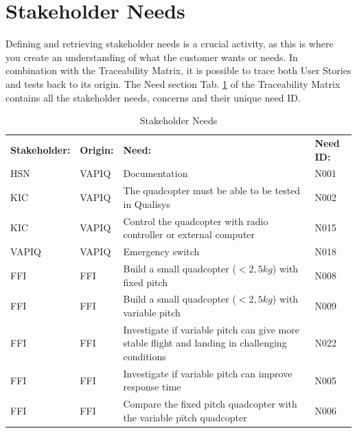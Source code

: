 \clearpage

\section{Stakeholder Needs}
Defining and retrieving stakeholder needs is a crucial activity, as this is where you create an understanding of what the customer wants or needs. In combination with the Traceability Matrix, it is possible to trace both User Stories and tests back to its origin. The Need section Tab. \ref{tab:stakeneeds} of the Traceability Matrix contains all the stakeholder needs, concerns and their unique need ID. 

\begin{table}[h]
    \centering
    \begin{tabular}{|m{2cm} p{1.5cm} p{9cm} p{2cm}|}
    \hline
\rowcolor{cadetgrey}\textbf{Stakeholder: } & \textbf{Origin: } & \textbf{Need: } & \textbf{Need ID: } \\
                        HSN & VAPIQ & Documentation & N001 \\ 
\rowcolor{gainsboro}    KIC & VAPIQ & The quadcopter must be able to be tested in Qualisys & N002\\
                        KIC & VAPIQ & Control the quadcopter with radio controller or external computer & N015  \\ 
\rowcolor{gainsboro}    VAPIQ & VAPIQ & Emergency switch & N018 \\
                        FFI & FFI & Build a small quadcopter ($<2,5 kg$) with fixed pitch & N008 \\ 
\rowcolor{gainsboro}    FFI & FFI & Build a small quadcopter ($<2,5 kg$) with variable pitch & N009\\
                        FFI & FFI & Investigate if variable pitch can give more stable flight and landing in challenging conditions & N022  \\ 
\rowcolor{gainsboro}    FFI & FFI & Investigate if variable pitch can improve response time & N005\\
                        FFI & FFI & Compare the fixed pitch quadcopter with the variable pitch quadcopter & N006  \\
\hline

    \end{tabular}
    \caption{Stakeholder Needs}
    \label{tab:stakeneeds}
\end{table}
\clearpage



